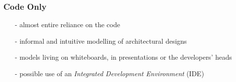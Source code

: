 %
%
%
%
%
%
%

\subsubsection{Code Only}
\label{code_only_heading}

\begin{itemize}
    \item[-] almost entire reliance on the code
    \item[-] informal and intuitive modelling of architectural designs
    \item[-] models living on whiteboards, in presentations or the developers' heads
    \item[-] possible use of an \emph{Integrated Development Environment} (IDE)
\end{itemize}

